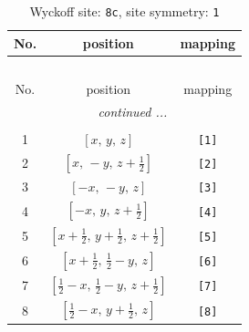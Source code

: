\documentclass[fleqn,8pt]{jsarticle}
\begin{document}
\renewcommand{\arraystretch}{1.2}
\begin{longtable}{ccc}
\caption{Wyckoff site: {\tt 8c}, site symmetry: {\tt 1}}
 \\
 \hline \hline
No. & position & mapping \\ \hline \endfirsthead

\multicolumn{2}{l}{\tablename\ \thetable{}} \\
 \hline \hline
No. & position & mapping \\ \hline \endhead

 \hline \hline
\multicolumn{2}{r}{\footnotesize\it continued ...} \\ \endfoot

 \hline \hline
\multicolumn{2}{r}{} \\ \endlastfoot

1 & $\left[ x,\, y,\, z \right]$ & {\tt [1]} \\ \hline
2 & $\left[ x,\, - y,\, z + \frac{1}{2} \right]$ & {\tt [2]} \\ \hline
3 & $\left[ - x,\, - y,\, z \right]$ & {\tt [3]} \\ \hline
4 & $\left[ - x,\, y,\, z + \frac{1}{2} \right]$ & {\tt [4]} \\ \hline
5 & $\left[ x + \frac{1}{2},\, y + \frac{1}{2},\, z + \frac{1}{2} \right]$ & {\tt [5]} \\ \hline
6 & $\left[ x + \frac{1}{2},\, \frac{1}{2} - y,\, z \right]$ & {\tt [6]} \\ \hline
7 & $\left[ \frac{1}{2} - x,\, \frac{1}{2} - y,\, z + \frac{1}{2} \right]$ & {\tt [7]} \\ \hline
8 & $\left[ \frac{1}{2} - x,\, y + \frac{1}{2},\, z \right]$ & {\tt [8]} \\
\end{longtable}
\end{document}
